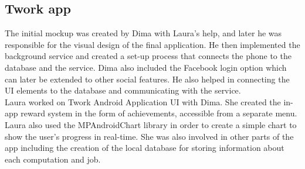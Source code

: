 \documentclass[a4paper,10pt]{article}
\begin{document}
\subsection{Twork app}
The initial mockup was created by Dima with Laura's help, and later he was responsible for the visual design of the final application. He then implemented the background service and created a set-up process that connects the phone to the database and the service. Dima also included the Facebook login option which can later be extended to other social features. He also helped in connecting the UI elements to the database and communicating with the service.\\

Laura worked on Twork Android Application UI with Dima. She created the in-app reward system in the form of achievements, accessible from a separate menu.
Laura also used the MPAndroidChart library in order to create a simple chart to show the user's progress in real-time.
She was also involved in other parts of the app including the creation of the local database for storing information about each computation and job.
\end{document}

